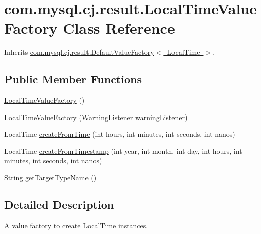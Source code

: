 \hypertarget{classcom_1_1mysql_1_1cj_1_1result_1_1_local_time_value_factory}{}\section{com.\+mysql.\+cj.\+result.\+Local\+Time\+Value\+Factory Class Reference}
\label{classcom_1_1mysql_1_1cj_1_1result_1_1_local_time_value_factory}


Inherits \mbox{\hyperlink{classcom_1_1mysql_1_1cj_1_1result_1_1_default_value_factory}{com.\+mysql.\+cj.\+result.\+Default\+Value\+Factory$<$ Local\+Time $>$}}.

\subsection*{Public Member Functions}
\begin{DoxyCompactItemize}
\item 
\mbox{\hyperlink{classcom_1_1mysql_1_1cj_1_1result_1_1_local_time_value_factory_a2c183353ce2e9f74b593d5820cb143f7}{Local\+Time\+Value\+Factory}} ()
\item 
\mbox{\hyperlink{classcom_1_1mysql_1_1cj_1_1result_1_1_local_time_value_factory_ab84fbdb4170bf14ff74ef62ab780843e}{Local\+Time\+Value\+Factory}} (\mbox{\hyperlink{interfacecom_1_1mysql_1_1cj_1_1_warning_listener}{Warning\+Listener}} warning\+Listener)
\item 
Local\+Time \mbox{\hyperlink{classcom_1_1mysql_1_1cj_1_1result_1_1_local_time_value_factory_add3ff17f39736a9b38d644e7383aa6a9}{create\+From\+Time}} (int hours, int minutes, int seconds, int nanos)
\item 
Local\+Time \mbox{\hyperlink{classcom_1_1mysql_1_1cj_1_1result_1_1_local_time_value_factory_a691f57fe6603e179cce35d54f6dd05f3}{create\+From\+Timestamp}} (int year, int month, int day, int hours, int minutes, int seconds, int nanos)
\item 
String \mbox{\hyperlink{classcom_1_1mysql_1_1cj_1_1result_1_1_local_time_value_factory_a3419a70fb7929d61229bf3df0f3a12a7}{get\+Target\+Type\+Name}} ()
\end{DoxyCompactItemize}


\subsection{Detailed Description}
A value factory to create \mbox{\hyperlink{}{Local\+Time}} instances. 

